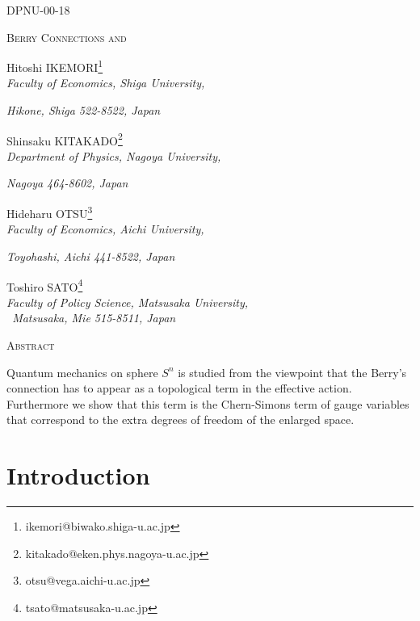 \documentclass[12pt,a4paper]{article}
\begin{document}
\begin{flushright}
DPNU-00-18
\end{flushright}
\vspace{30pt}

\begin{center}
{\LARGE \scshape Berry Connections and }



Hitoshi IKEMORI\footnote{%
ikemori@biwako.shiga-u.ac.jp} \\[0pt]
\textit{Faculty of Economics, Shiga University,}

\textit{Hikone, Shiga 522-8522, Japan}

\medskip

Shinsaku KITAKADO\footnote{%
kitakado@eken.phys.nagoya-u.ac.jp} \\[0pt]
\textit{Department of Physics, Nagoya University,}

\textit{Nagoya 464-8602, Japan}

\medskip

Hideharu OTSU\footnote{%
otsu@vega.aichi-u.ac.jp} \\[0pt]
\textit{Faculty of Economics, Aichi University, }

\textit{Toyohashi, Aichi 441-8522, Japan}

\medskip

Toshiro SATO\footnote{%
tsato@matsusaka-u.ac.jp} \\[0pt]
\textit{Faculty of Policy Science, Matsusaka University,}\\[0pt]
\textit{\ Matsusaka, Mie 515-8511, Japan\bigskip }

\vspace{30pt} {\Large \scshape Abstract}
\end{center}

Quantum mechanics on sphere $S^{n}$ is studied from the viewpoint that the
Berry's connection has to appear as a topological term in the effective
action. Furthermore we show that this term is the Chern-Simons term of gauge
variables that correspond to the extra degrees of freedom of the enlarged
space.\newpage

\section{Introduction}
\end{document}
